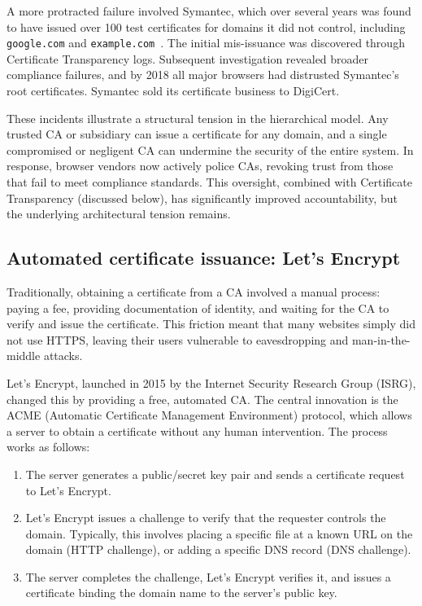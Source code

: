 \documentclass[11pt]{article}
\begin{document}
A more protracted failure involved Symantec, which over several years
was found to have issued over 100 test certificates for domains it
did not control, including \verb'google.com' and
\verb'example.com'~\citep{SymantecDistrust}.  The initial mis-issuance
was discovered through Certificate Transparency logs.  Subsequent
investigation revealed broader compliance failures, and by 2018 all
major browsers had distrusted Symantec's root certificates.  Symantec
sold its certificate business to DigiCert.

These incidents illustrate a structural tension in the hierarchical
model.  Any trusted CA or subsidiary can issue a certificate for any
domain, and a single compromised or negligent CA can undermine the
security of the entire system.  In response, browser vendors now
actively police CAs, revoking trust from those that fail to meet
compliance standards.  This oversight, combined with Certificate
Transparency (discussed below), has significantly improved
accountability, but the underlying architectural tension remains.

\subsection{Automated certificate issuance: Let's Encrypt}

Traditionally, obtaining a certificate from a CA involved a manual process:
paying a fee, providing documentation of identity, and waiting for the CA to
verify and issue the certificate. This friction meant that many websites simply
did not use HTTPS, leaving their users vulnerable to eavesdropping and
man-in-the-middle attacks.

Let's Encrypt, launched in 2015 by the Internet Security Research Group (ISRG),
changed this by providing a free, automated CA. The central innovation is the
ACME (Automatic Certificate Management Environment) protocol, which allows a
server to obtain a certificate without any human intervention. The process works
as follows:
\begin{enumerate}
\item The server generates a public/secret key pair and sends a certificate
  request to Let's Encrypt.
\item Let's Encrypt issues a challenge to verify that the requester controls
  the domain. Typically, this involves placing a specific file at a known URL
  on the domain (HTTP challenge), or adding a specific DNS record (DNS
  challenge).
\item The server completes the challenge, Let's Encrypt verifies it, and issues
  a certificate binding the domain name to the server's public key.
\end{enumerate}
\end{document}
